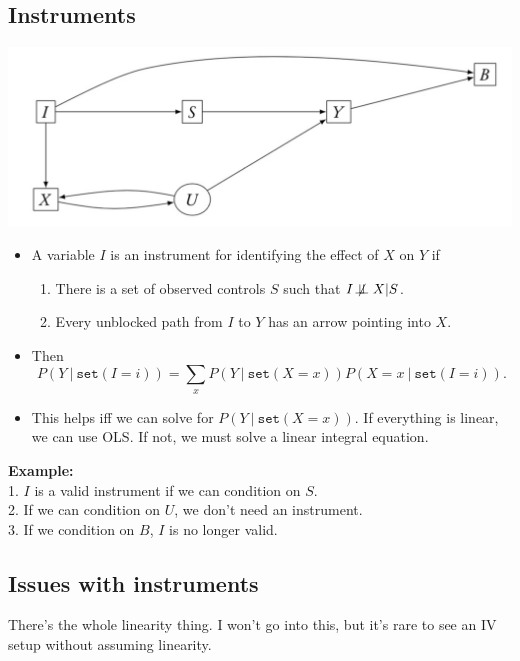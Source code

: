 \documentclass[]{article}
\providecommand{\tightlist}{%
  \setlength{\itemsep}{0pt}\setlength{\parskip}{0pt}}
\begin{document}
\hypertarget{instruments}{%
\subsection{Instruments}\label{instruments}}

\begin{center}\includegraphics[width=0.5\linewidth]{gfx/instrument} \end{center}

\begin{itemize}
\item
  A variable \(I\) is an instrument for identifying the effect of \(X\)
  on \(Y\) if

  \begin{enumerate}
  \def\labelenumi{\arabic{enumi}.}
  \tightlist
  \item
    There is a set of observed controls \(S\) such that
    \(I \not\!\perp\!\!\!\perp X | S\).
  \item
    Every unblocked path from \(I\) to \(Y\) has an arrow pointing into
    \(X\).
  \end{enumerate}
\item
  Then \[
  P(Y\ \vert\ \texttt{set}(I=i)) = \sum_x P(Y\ \vert\ \texttt{set}(X=x)) P(X=x \ \vert\ \texttt{set}(I=i)).
  \]
\item
  This helps iff we can solve for \(P(Y\ \vert\ \texttt{set}(X=x))\). If
  everything is linear, we can use OLS. If not, we must solve a linear
  integral equation.
\end{itemize}

\textbf{Example:}\\
1. \(I\) is a valid instrument if we can condition on \(S\).\\
2. If we can condition on \(U\), we don't need an instrument.\\
3. If we condition on \(B\), \(I\) is no longer valid.

\hypertarget{issues-with-instruments}{%
\subsection{Issues with instruments}\label{issues-with-instruments}}

There's the whole linearity thing. I won't go into this, but it's rare
to see an IV setup without assuming linearity.
\end{document}
